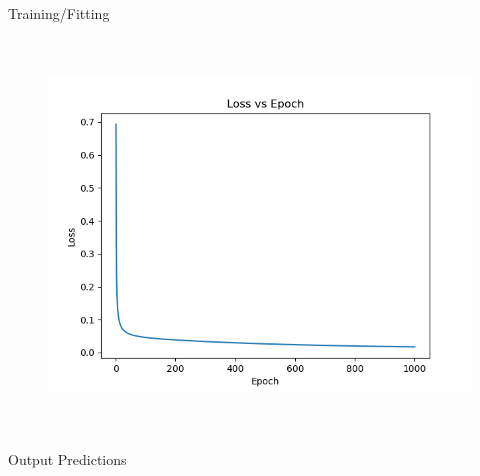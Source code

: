 \documentclass[12pt]{article}
\renewcommand{\_}{\kern-1.5pt\textunderscore\kern-1.5pt}
\begin{document}

\par

\textcolor[HTML]{202122}{Training/Fitting}\par




\begin{figure}[H]
	\begin{Center}
		\includegraphics[width=5.46in,height=4.1in]{./media/image39.png}
	\end{Center}
\end{figure}



\par

\textcolor[HTML]{202122}{Output Predictions}\par



\end{document}
